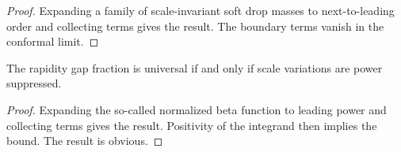 \begin{proof}
Expanding a family of scale-invariant soft drop masses to
next-to-leading order and collecting terms gives the result. The
boundary terms vanish in the conformal limit.
\end{proof}

\begin{lemma}\label{thm:4}
The rapidity gap fraction is universal if and only if scale variations
are power suppressed.
\end{lemma}

\begin{proof}
Expanding the so-called normalized beta function to leading power and
collecting terms gives the result. Positivity of the integrand then
implies the bound. The result is obvious.
\end{proof}

